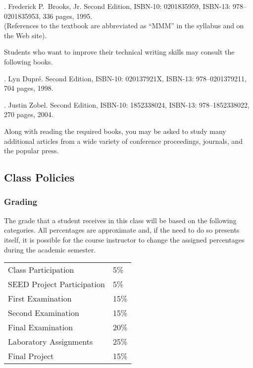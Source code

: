 \documentclass[11pt]{article}
\begin{document}
. Frederick P.\ Brooks, Jr.
Second Edition, ISBN-10: 0201835959, ISBN-13: 978--0201835953, 336 pages, 1995. \\
(References to the textbook are abbreviated as ``MMM'' in the syllabus and on the Web site).

\noindent
Students who want to improve their technical writing skills may consult the following books.

. Lyn Dupr\'e. Second Edition,  ISBN-10: 020137921X,
ISBN-13: 978--0201379211, 704 pages, 1998.

. Justin Zobel. Second Edition, ISBN-10: 1852338024, ISBN-13:
978--1852338022, 270 pages, 2004.

\noindent
Along with reading the required books, you may be asked to study many additional articles from a wide variety of
conference proceedings, journals, and the popular press.

\subsection*{Class Policies}

\subsubsection*{Grading}

The grade that a student receives in this class will be based on the following categories. All percentages are
approximate and, if the need to do so presents itself, it is possible for the course instructor to change the assigned
percentages during the academic semester.

\begin{center}
  \begin{tabular}{ll}
    Class Participation        & 5\%  \\
    SEED Project Participation & 5\%  \\
    First Examination          & 15\% \\
    Second Examination         & 15\% \\
    Final Examination          & 20\% \\
    Laboratory Assignments     & 25\% \\
    Final Project              & 15\%
  \end{tabular}
\end{center}
\end{document}
